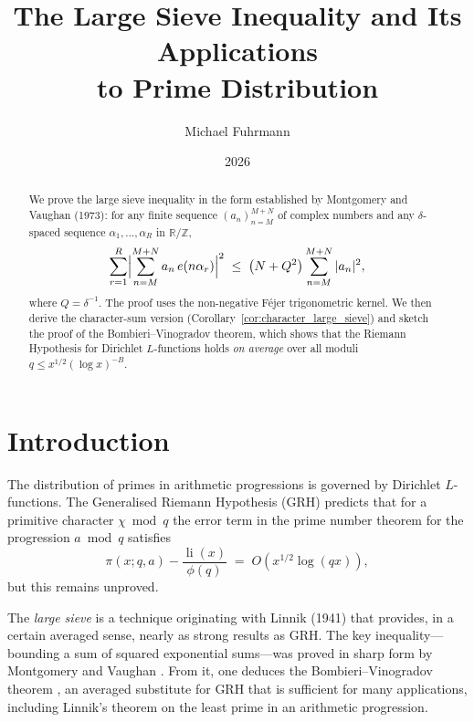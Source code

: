 \documentclass[12pt,a4paper]{amsart}
\theoremstyle{definition}
\newcommand{\Z}{\mathbb{Z}}
\newcommand{\R}{\mathbb{R}}
\DeclareMathOperator{\li}{li}
\newcommand{\eexp}[1]{e\!\left(#1\right)}
\begin{document}

\title{The Large Sieve Inequality and Its Applications\\to Prime Distribution}

\author{Michael Fuhrmann}
\address{Specialist Mathematics Project, Build 153}
\date{2026}

\begin{abstract}
We prove the large sieve inequality in the form established by Montgomery
and Vaughan (1973): for any finite sequence $(a_n)_{n=M}^{M+N}$ of complex
numbers and any $\delta$-spaced sequence $\alpha_1,\ldots,\alpha_R$ in
$\R/\Z$,
\[
  \sum_{r=1}^{R}\Bigl|\sum_{n=M}^{M+N} a_n\,\eexp{n\alpha_r}\Bigr|^{2}
  \;\leq\;
  \bigl(N + Q^{2}\bigr)\sum_{n=M}^{M+N}|a_n|^{2},
\]
where $Q = \delta^{-1}$.  The proof uses the non-negative Féjer trigonometric
kernel.  We then derive the character-sum version
(Corollary~\ref{cor:character_large_sieve}) and sketch the proof of the
Bombieri--Vinogradov theorem, which shows that the Riemann Hypothesis for
Dirichlet $L$-functions holds \emph{on average} over all moduli $q \leq
x^{1/2}(\log x)^{-B}$.
\end{abstract}

\maketitle
\tableofcontents

\section{Introduction}

The distribution of primes in arithmetic progressions is governed by
Dirichlet $L$-functions.  The Generalised Riemann Hypothesis (GRH) predicts
that for a primitive character $\chi\bmod q$ the error term in the prime
number theorem for the progression $a\bmod q$ satisfies
\[
  \pi(x;q,a) - \frac{\li(x)}{\phi(q)}
  \;=\; O\!\left(x^{1/2}\log(qx)\right),
\]
but this remains unproved.

The \emph{large sieve} is a technique originating with Linnik (1941) that
provides, in a certain averaged sense, nearly as strong results as GRH.
The key inequality---bounding a sum of squared exponential sums---was proved
in sharp form by Montgomery and Vaughan \cite{MV1973}.  From it, one deduces
the Bombieri--Vinogradov theorem \cite{Bombieri1965}, an averaged substitute
for GRH that is sufficient for many applications, including Linnik's theorem
on the least prime in an arithmetic progression.
\end{document}
